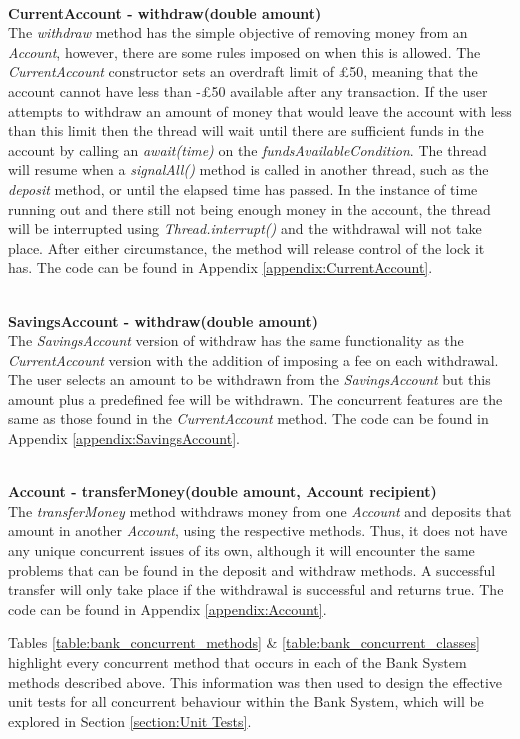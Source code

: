 \documentclass[a4paper,12pt]{article}
\begin{document}
\textbf{\\CurrentAccount - withdraw(double amount)}
\\The \textit{withdraw} method has the simple objective of removing money from an \textit{Account}, however, there are some rules imposed on when this is allowed. The \textit{CurrentAccount} constructor sets an overdraft limit of £50, meaning that the account cannot have less than -£50 available after any transaction. If the user attempts to withdraw an amount of money that would leave the account with less than this limit then the thread will wait until there are sufficient funds in the account by calling an \textit{await(time)} on the \textit{fundsAvailableCondition}. The thread will resume when a \textit{signalAll()} method is called in another thread, such as the \textit{deposit} method, or until the elapsed time has passed. In the instance of time running out and there still not being enough money in the account, the thread will be interrupted using \textit{Thread.interrupt()} and the withdrawal will not take place. After either circumstance, the method will release control of the lock it has. The code can be found in Appendix \ref{appendix:CurrentAccount}. 

\textbf{\\SavingsAccount - withdraw(double amount)}
\\The \textit{SavingsAccount} version of withdraw has the same functionality as the \textit{CurrentAccount} version with the addition of imposing a fee on each withdrawal. The user selects an amount to be withdrawn from the \textit{SavingsAccount} but this amount plus a predefined fee will be withdrawn. The concurrent features are the same as those found in the \textit{CurrentAccount} method. The code can be found in Appendix \ref{appendix:SavingsAccount}. 

\textbf{\\Account - transferMoney(double amount, Account recipient)}
\\The \textit{transferMoney} method withdraws money from one \textit{Account} and deposits that amount in another \textit{Account}, using the respective methods. Thus, it does not have any unique concurrent issues of its own, although it will encounter the same problems that can be found in the deposit and withdraw methods. A successful transfer will only take place if the withdrawal is successful and returns true. The code can be found in Appendix \ref{appendix:Account}. 

Tables \ref{table:bank_concurrent_methods} \& \ref{table:bank_concurrent_classes} highlight every concurrent method that occurs in each of the Bank System methods described above. This information was then used to design the effective unit tests for all concurrent behaviour within the Bank System, which will be explored in Section \ref{section:Unit Tests}.
\end{document}

